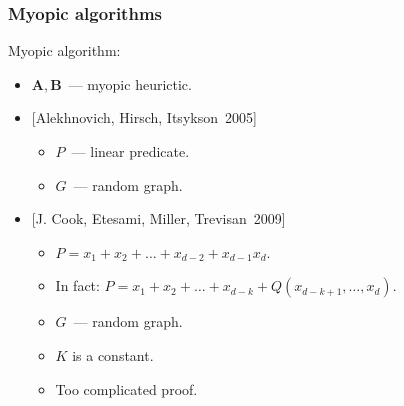 \begin{frame}
    \frametitle{Myopic algorithms}

    \pause

    \begin{definition}
		Myopic algorithm:
        \begin{itemize}
	        \item $\mathbf{A}, \mathbf{B}$~--- myopic heurictic.
        \end{itemize}
	\end{definition}

    \pause

    \begin{itemize}
    	\item{} [Alekhnovich, Hirsch, Itsykson~2005]
            \begin{itemize}
	            \item $P$~--- linear predicate.
            	\item $G$~--- random graph.
            \end{itemize}
        \pause
        \item{} [J. Cook, Etesami, Miller, Trevisan~2009] 
            \begin{itemize}
                \pause
   	            \item $P = x_1 + x_2 + \dots + x_{d - 2} + x_{d - 1}x_{d}$.
	            \item In fact: $P = x_1 + x_2 + \dots + x_{d - k} +
            		Q(x_{d - k + 1}, \dots, x_d)$.
                \pause
            	\item $G$~--- random graph.
            	\pause
            	\item $K$ is a constant.
            	\pause
            	\item Too complicated proof.
            \end{itemize}
    \end{itemize}
\end{frame}


